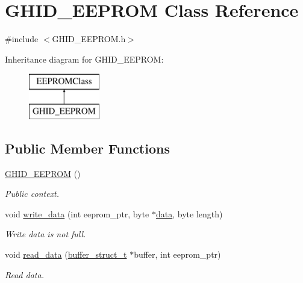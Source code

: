 \hypertarget{class_g_h_i_d___e_e_p_r_o_m}{\section{\-G\-H\-I\-D\-\_\-\-E\-E\-P\-R\-O\-M \-Class \-Reference}
\label{class_g_h_i_d___e_e_p_r_o_m}
}


{\ttfamily \#include $<$\-G\-H\-I\-D\-\_\-\-E\-E\-P\-R\-O\-M.\-h$>$}

\-Inheritance diagram for \-G\-H\-I\-D\-\_\-\-E\-E\-P\-R\-O\-M\-:\begin{figure}[H]
\begin{center}
\leavevmode
\includegraphics[height=2.000000cm]{class_g_h_i_d___e_e_p_r_o_m}
\end{center}
\end{figure}
\subsection*{\-Public \-Member \-Functions}
\begin{DoxyCompactItemize}
\item 
\hyperlink{class_g_h_i_d___e_e_p_r_o_m_a47a71d5c793a5ca3c63e705f713580be}{\-G\-H\-I\-D\-\_\-\-E\-E\-P\-R\-O\-M} ()
\begin{DoxyCompactList}\small\item\em \-Public context. \end{DoxyCompactList}\item 
void \hyperlink{class_g_h_i_d___e_e_p_r_o_m_a2efced423e40b744365f535b11b2b38c}{write\-\_\-data} (int eeprom\-\_\-ptr, byte $\ast$\hyperlink{masstorage_8h_afb87d045bbf32b236fc425efe02bdc7b}{data}, byte length)
\begin{DoxyCompactList}\small\item\em \-Write data is not full. \end{DoxyCompactList}\item 
void \hyperlink{class_g_h_i_d___e_e_p_r_o_m_a5e464f6c5b053b98cc2348bb88a6cb78}{read\-\_\-data} (\hyperlink{structbuffer__struct__t}{buffer\-\_\-struct\-\_\-t} $\ast$buffer, int eeprom\-\_\-ptr)
\begin{DoxyCompactList}\small\item\em \-Read data. \end{DoxyCompactList}\end{DoxyCompactItemize}


